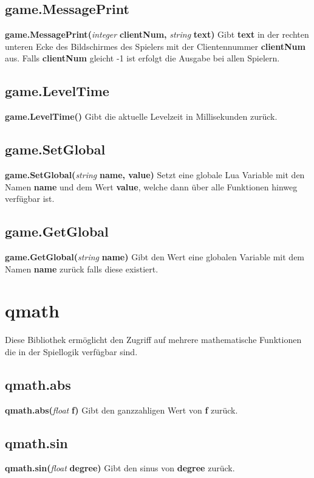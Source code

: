 \documentclass[11pt,a4paper]{book}
\begin{document}
\subsection{game.MessagePrint}
\label{g-messagepritn}
\textbf{game.MessagePrint(}\textit{integer}\textbf{ clientNum, }\textit{string}\textbf{ text)}
\newline
Gibt \textbf{text} in der rechten unteren Ecke des Bildschirmes des Spielers mit der Clientennummer \textbf{clientNum} aus. Falls \textbf{clientNum} gleicht -1 ist erfolgt die Ausgabe bei allen Spielern.
\subsection{game.LevelTime}
\label{g-leveltime}
\textbf{game.LevelTime()}
Gibt die aktuelle Levelzeit in Millisekunden zurück.
\subsection{game.SetGlobal}
\label{g-setglobal}
\textbf{game.SetGlobal(}\textit{string}\textbf{ name, value)}
\newline
Setzt eine globale Lua Variable mit den Namen \textbf{name} und dem Wert \textbf{value}, welche dann über alle Funktionen hinweg verfügbar ist.
\subsection{game.GetGlobal}
\label{g-getglobal}
\textbf{game.GetGlobal(}\textit{string}\textbf{ name)}
\newline
Gibt den Wert eine globalen Variable mit dem Namen \textbf{name} zurück falls diese existiert.
\newpage
\section{qmath}
\label{qmath}
Diese Bibliothek ermöglicht den Zugriff auf mehrere mathematische Funktionen die in der Spiellogik verfügbar sind.
\subsection{qmath.abs}
\label{qm-abs}
\textbf{qmath.abs(}\textit{float}\textbf{ f)}
\newline
Gibt den ganzzahligen Wert von \textbf{f} zurück.
\subsection{qmath.sin}
\label{qm-sin}
\textbf{qmath.sin(}\textit{float}\textbf{ degree)}
\newline
Gibt den sinus von \textbf{degree} zurück.
\end{document}
